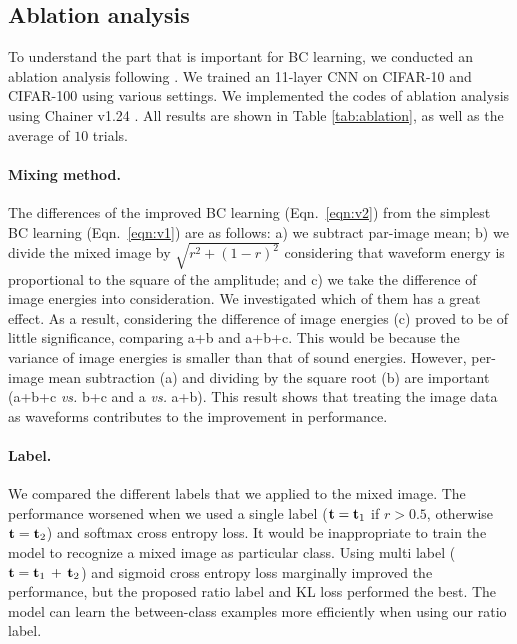 \documentclass[10pt,twocolumn,letterpaper]{article}
\begin{document}
\subsection{Ablation analysis}
To understand the part that is important for BC learning, we conducted an ablation analysis following \cite{tokozume2018learning}. We trained an 11-layer CNN on CIFAR-10 and CIFAR-100 using various settings. We implemented the codes of ablation analysis using Chainer v1.24 \cite{tokui2015chainer}. All results are shown in Table \ref{tab:ablation}, as well as the average of $10$ trials.

\paragraph{Mixing method.}
The differences of the improved BC learning (Eqn.~\ref{eqn:v2}) from the simplest BC learning (Eqn.~\ref{eqn:v1}) are as follows: a) we subtract par-image mean; b) we divide the mixed image by $\sqrt{r^2 + (1-r)^2}$ considering that waveform energy is proportional to the square of the amplitude; and c) we take the difference of image energies into consideration. We investigated which of them has a great effect. As a result, considering the difference of image energies (c) proved to be of little significance, comparing a+b and a+b+c. This would be because the variance of image energies is smaller than that of sound energies. However, per-image mean subtraction (a) and dividing by the square root (b) are important (a+b+c {\it vs.} b+c and a {\it vs.} a+b). This result shows that treating the image data as waveforms contributes to the improvement in performance.

\paragraph{Label.}
We compared the different labels that we applied to the mixed image. The performance worsened when we used a single label (${\bf t}={\bf t}_1$ if $r>0.5$, otherwise ${\bf t}={\bf t}_2$) and softmax cross entropy loss. It would be inappropriate to train the model to recognize a mixed image as particular class. Using multi label (${\bf t}={\bf t}_1\,+\,{\bf t}_2$) and sigmoid cross entropy loss marginally improved the performance, but the proposed ratio label and KL loss performed the best. The model can learn the between-class examples more efficiently when using our ratio label.
\end{document}
